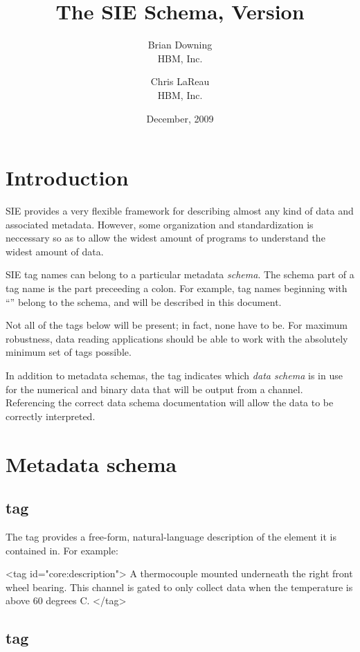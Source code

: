 \documentclass{article}
\title{The \xml{core} SIE Schema, Version \corever{}}
\author{
Brian Downing \\ HBM, Inc. \and
Chris LaReau \\ HBM, Inc.
}
\date{December, 2009}
\begin{document}
\maketitle

\section{Introduction}

SIE provides a very flexible framework for describing almost any kind
of data and associated metadata.  However, some organization and
standardization is neccessary so as to allow the widest amount of
programs to understand the widest amount of data.

SIE tag names can belong to a particular metadata \emph{schema}.  The
schema part of a tag name is the part preceeding a colon.  For
example, tag names beginning with ``'' belong to the
 schema, and will be described in this document.

Not all of the tags below will be present; in fact, none have to be.
For maximum robustness, data reading applications should be able to
work with the absolutely minimum set of tags possible.

In addition to metadata schemas, the  tag indicates
which \emph{data schema} is in use for the numerical and binary data
that will be output from a channel.  Referencing the correct data
schema documentation will allow the data to be correctly interpreted.

\section{Metadata schema}

\subsection{ tag}

The  tag provides a free-form, natural-language
description of the element it is contained in.  For example:

\begin{siexmlexample}
<tag id="core:description">
  A thermocouple mounted underneath the right front wheel bearing.  
  This channel is gated to only collect data when the temperature is 
  above 60 degrees C.
</tag>
\end{siexmlexample}

\subsection{ tag}
\end{document}
